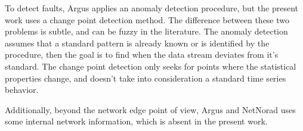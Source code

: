 To detect faults, Argus applies an anomaly detection procedure, but the present
work uses a change point detection method. The difference between
these two problems is subtle, and can be fuzzy in the literature. The
anomaly detection assumes that a standard pattern is already known or
is identified by the procedure, then the goal is to find when the data
stream
deviates from it's standard. The change point detection only seeks for
points where the statistical properties change, and doesn't take into
consideration a standard time series behavior.

Additionally, beyond the network edge point of view, Argus and NetNorad
uses some internal network information, which is absent in the present work.

